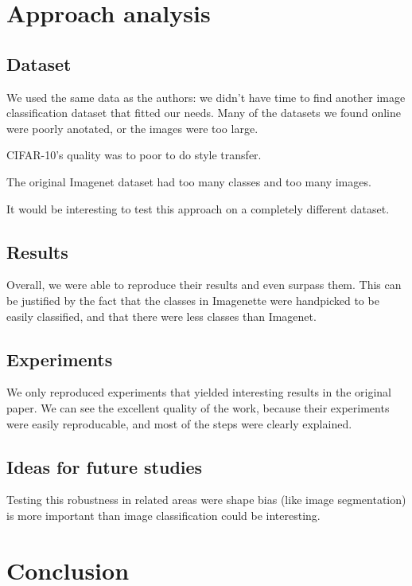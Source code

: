 \documentclass{article}
\begin{document}
\newpage
\section{Approach analysis}

\subsection{Dataset}

We used the same data as the authors: we didn't have time
to find another image classification dataset that fitted our needs.
Many of the datasets we found online were poorly anotated, or the images
were too large.

CIFAR-10's quality was to poor to do style transfer.

The original Imagenet dataset had too many classes and too many images.

It would be interesting to test this approach on a completely different dataset.

\subsection{Results}

Overall, we were able to reproduce their results and
even surpass them. This can be justified by the fact that the classes
in Imagenette were handpicked to be easily classified, and that there were less 
classes than Imagenet.

\subsection{Experiments}

We only reproduced experiments that yielded interesting results 
in the original paper. We can see the excellent quality of the work, 
because their experiments were easily reproducable, and most of the 
steps were clearly explained.

\subsection{Ideas for future studies}

Testing this robustness in related areas were shape bias (like image segmentation) 
is more important than image classification could be interesting.

\newpage
\section{Conclusion}
\end{document}
